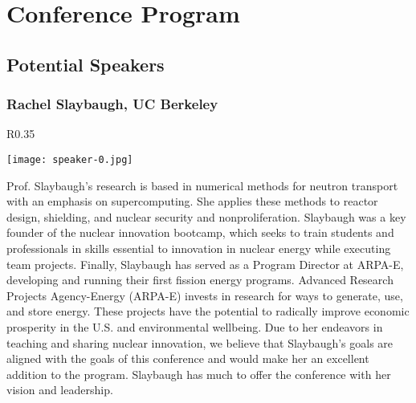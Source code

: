 \section{Conference Program}

\subsection{Potential Speakers}

\subsubsection{Rachel Slaybaugh, UC Berkeley}
\setlength\intextsep{0pt}
\begin{wrapfigure}{R}{0.35\textwidth}
	\begin{center}
		\vspace{-\baselineskip}
		\texttt{[image: speaker-0.jpg]}
	\end{center}
\end{wrapfigure}
Prof. Slaybaugh's research is based in numerical methods for neutron transport with an emphasis on supercomputing. She applies these methods to reactor design, shielding, and nuclear security and nonproliferation. Slaybaugh was a key founder of the nuclear innovation bootcamp, which seeks to train students and professionals in skills essential to innovation in nuclear energy while executing team projects. Finally, Slaybaugh has served as a Program Director at ARPA-E, developing and running their first fission energy programs. Advanced Research Projects Agency-Energy (ARPA-E) invests in research for ways to generate, use, and store energy. These projects have the potential to radically improve economic prosperity in the U.S. and environmental wellbeing. Due to her endeavors in teaching and sharing nuclear innovation, we believe that Slaybaugh's goals are aligned with the goals of this conference and would make her an excellent addition to the program. Slaybaugh has much to offer the conference with her vision and leadership.\\
\clearpage

